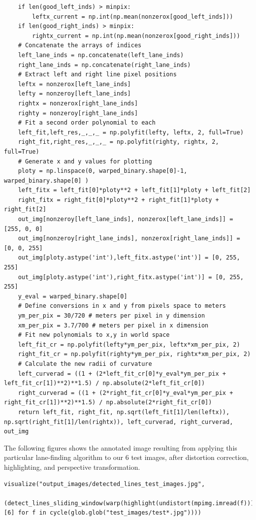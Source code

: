 \documentclass[11pt]{article}
\begin{document}
\begin{verbatim}
	if len(good_left_inds) > minpix:
	    leftx_current = np.int(np.mean(nonzerox[good_left_inds]))
	if len(good_right_inds) > minpix:        
	    rightx_current = np.int(np.mean(nonzerox[good_right_inds]))
    # Concatenate the arrays of indices
    left_lane_inds = np.concatenate(left_lane_inds)
    right_lane_inds = np.concatenate(right_lane_inds)
    # Extract left and right line pixel positions
    leftx = nonzerox[left_lane_inds]
    lefty = nonzeroy[left_lane_inds] 
    rightx = nonzerox[right_lane_inds]
    righty = nonzeroy[right_lane_inds] 
    # Fit a second order polynomial to each
    left_fit,left_res,_,_,_ = np.polyfit(lefty, leftx, 2, full=True)
    right_fit,right_res,_,_,_ = np.polyfit(righty, rightx, 2, full=True)
    # Generate x and y values for plotting
    ploty = np.linspace(0, warped_binary.shape[0]-1, warped_binary.shape[0] )
    left_fitx = left_fit[0]*ploty**2 + left_fit[1]*ploty + left_fit[2]
    right_fitx = right_fit[0]*ploty**2 + right_fit[1]*ploty + right_fit[2]
    out_img[nonzeroy[left_lane_inds], nonzerox[left_lane_inds]] = [255, 0, 0]
    out_img[nonzeroy[right_lane_inds], nonzerox[right_lane_inds]] = [0, 0, 255]
    out_img[ploty.astype('int'),left_fitx.astype('int')] = [0, 255, 255]
    out_img[ploty.astype('int'),right_fitx.astype('int')] = [0, 255, 255]
    y_eval = warped_binary.shape[0]
    # Define conversions in x and y from pixels space to meters
    ym_per_pix = 30/720 # meters per pixel in y dimension
    xm_per_pix = 3.7/700 # meters per pixel in x dimension
    # Fit new polynomials to x,y in world space
    left_fit_cr = np.polyfit(lefty*ym_per_pix, leftx*xm_per_pix, 2)
    right_fit_cr = np.polyfit(righty*ym_per_pix, rightx*xm_per_pix, 2)
    # Calculate the new radii of curvature
    left_curverad = ((1 + (2*left_fit_cr[0]*y_eval*ym_per_pix + left_fit_cr[1])**2)**1.5) / np.absolute(2*left_fit_cr[0])
    right_curverad = ((1 + (2*right_fit_cr[0]*y_eval*ym_per_pix + right_fit_cr[1])**2)**1.5) / np.absolute(2*right_fit_cr[0])
    return left_fit, right_fit, np.sqrt(left_fit[1]/len(leftx)), np.sqrt(right_fit[1]/len(rightx)), left_curverad, right_curverad, out_img
\end{verbatim}

The following figures shows the annotated image resulting from
applying this particular lane-finding algorithm to our 6 test
images, after distortion correction, highlighting, and
perspective transformation.

\begin{verbatim}
visualize("output_images/detected_lines_test_images.jpg",
	  (detect_lines_sliding_window(warp(highlight(undistort(mpimg.imread(f)))))[6] for f in cycle(glob.glob("test_images/test*.jpg"))))
\end{verbatim}
\end{document}
